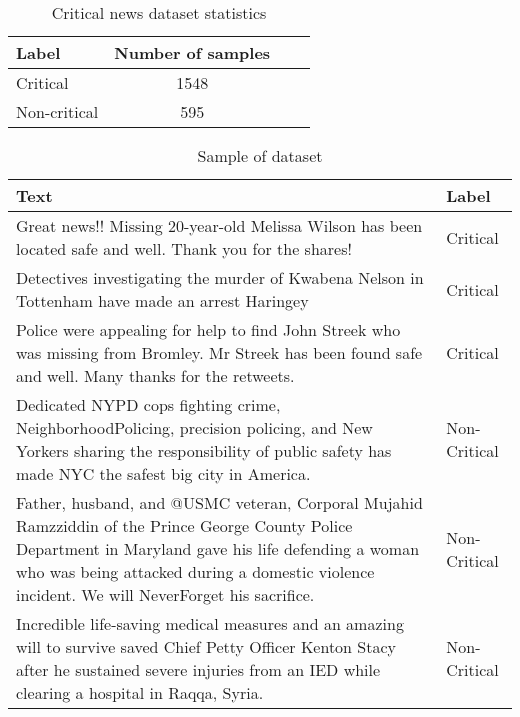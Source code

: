 \begin{table}
\begin{center}
\caption{Critical news dataset statistics}
\label{tbl:dataset_statistics}
\begin{tabular}{@{}lccc@{}}
\toprule 
\rule[-1pt]{0pt}{14pt}Label&Number of samples\\
\midrule 
\rule[-1pt]{0pt}{14pt}Critical&1548\\
\rule[-1pt]{0pt}{14pt}Non-critical&595\\
\bottomrule
\end{tabular}
\end{center}
\end{table}

\begin{table}
\begin{center}
\caption{Sample of dataset}
\label{tbl:dataset_sample}
\begin{tabular}{p{12cm}p{2cm}}
\toprule 
\rule[-1pt]{0pt}{14pt}Text&Label\\
\midrule 
\rule[-1pt]{0pt}{14pt}Great news!! Missing 20-year-old Melissa Wilson has been located safe and well. Thank you for the shares!&Critical\\
\hline
\rule[-1pt]{0pt}{14pt}Detectives investigating the murder of Kwabena Nelson in Tottenham have made an arrest Haringey&Critical\\
\hline
\rule[-1pt]{0pt}{14pt}Police were appealing for help to find John Streek who was missing from Bromley. Mr Streek has been found safe and well. Many thanks for the retweets.&Critical\\
\hline
\rule[-1pt]{0pt}{14pt}Dedicated NYPD cops fighting crime, NeighborhoodPolicing, precision policing, and New Yorkers sharing the responsibility of public safety has made NYC the safest
big city in America.&Non-Critical\\
\hline
\rule[-1pt]{0pt}{14pt}Father, husband, and @USMC veteran, Corporal Mujahid Ramzziddin of the Prince George County Police Department in Maryland gave his life defending a woman who was being attacked during a domestic violence incident. We will NeverForget his sacrifice. &Non-Critical\\
\hline
\rule[-1pt]{0pt}{14pt}Incredible life-saving medical measures and an amazing will to survive saved Chief Petty Officer Kenton Stacy after he sustained severe injuries from an IED while clearing a hospital in Raqqa, Syria.&Non-Critical\\
\bottomrule
\end{tabular}
\end{center}
\end{table}


